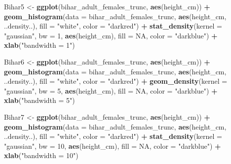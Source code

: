 \documentclass[]{book}
\newenvironment{Shaded}{\begin{snugshade}}{\end{snugshade}}
\newcommand{\KeywordTok}[1]{\textcolor[rgb]{0.13,0.29,0.53}{\textbf{#1}}}
\newcommand{\DataTypeTok}[1]{\textcolor[rgb]{0.13,0.29,0.53}{#1}}
\newcommand{\DecValTok}[1]{\textcolor[rgb]{0.00,0.00,0.81}{#1}}
\newcommand{\StringTok}[1]{\textcolor[rgb]{0.31,0.60,0.02}{#1}}
\newcommand{\OtherTok}[1]{\textcolor[rgb]{0.56,0.35,0.01}{#1}}
\newcommand{\OperatorTok}[1]{\textcolor[rgb]{0.81,0.36,0.00}{\textbf{#1}}}
\newcommand{\NormalTok}[1]{#1}
\theoremstyle{definition}
\theoremstyle{definition}
\theoremstyle{definition}
\theoremstyle{remark}
\begin{document}
\begin{Shaded}
\begin{Highlighting}[]
\NormalTok{Bihar5 <-}\StringTok{ }\KeywordTok{ggplot}\NormalTok{(bihar_adult_females_trunc, }\KeywordTok{aes}\NormalTok{(height_cm)) }\OperatorTok{+}\StringTok{ }
\StringTok{  }\KeywordTok{geom_histogram}\NormalTok{(}\DataTypeTok{data =}\NormalTok{ bihar_adult_females_trunc, }\KeywordTok{aes}\NormalTok{(height_cm, ..density..), }\DataTypeTok{fill =} \StringTok{"white"}\NormalTok{, }\DataTypeTok{color =} \StringTok{"darkred"}\NormalTok{) }\OperatorTok{+}
\StringTok{  }\KeywordTok{stat_density}\NormalTok{(}\DataTypeTok{kernel =} \StringTok{"gaussian"}\NormalTok{, }\DataTypeTok{bw =} \DecValTok{1}\NormalTok{, }\KeywordTok{aes}\NormalTok{(height_cm), }\DataTypeTok{fill =} \OtherTok{NA}\NormalTok{, }\DataTypeTok{color =} \StringTok{"darkblue"}\NormalTok{) }\OperatorTok{+}
\StringTok{  }\KeywordTok{xlab}\NormalTok{(}\StringTok{"bandwidth = 1"}\NormalTok{)}

\NormalTok{Bihar6 <-}\StringTok{ }\KeywordTok{ggplot}\NormalTok{(bihar_adult_females_trunc, }\KeywordTok{aes}\NormalTok{(height_cm)) }\OperatorTok{+}\StringTok{ }
\StringTok{  }\KeywordTok{geom_histogram}\NormalTok{(}\DataTypeTok{data =}\NormalTok{ bihar_adult_females_trunc, }\KeywordTok{aes}\NormalTok{(height_cm, ..density..), }\DataTypeTok{fill =} \StringTok{"white"}\NormalTok{, }\DataTypeTok{color =} \StringTok{"darkred"}\NormalTok{) }\OperatorTok{+}
\StringTok{  }\KeywordTok{geom_density}\NormalTok{(}\DataTypeTok{kernel =} \StringTok{"gaussian"}\NormalTok{, }\DataTypeTok{bw =} \DecValTok{5}\NormalTok{, }\KeywordTok{aes}\NormalTok{(height_cm), }\DataTypeTok{fill =} \OtherTok{NA}\NormalTok{, }\DataTypeTok{color =} \StringTok{"darkblue"}\NormalTok{) }\OperatorTok{+}
\StringTok{  }\KeywordTok{xlab}\NormalTok{(}\StringTok{"bandwidth = 5"}\NormalTok{)}

\NormalTok{Bihar7 <-}\StringTok{ }\KeywordTok{ggplot}\NormalTok{(bihar_adult_females_trunc, }\KeywordTok{aes}\NormalTok{(height_cm)) }\OperatorTok{+}\StringTok{ }
\StringTok{  }\KeywordTok{geom_histogram}\NormalTok{(}\DataTypeTok{data =}\NormalTok{ bihar_adult_females_trunc, }\KeywordTok{aes}\NormalTok{(height_cm, ..density..), }\DataTypeTok{fill =} \StringTok{"white"}\NormalTok{, }\DataTypeTok{color =} \StringTok{"darkred"}\NormalTok{) }\OperatorTok{+}
\StringTok{  }\KeywordTok{stat_density}\NormalTok{(}\DataTypeTok{kernel =} \StringTok{"gaussian"}\NormalTok{, }\DataTypeTok{bw =} \DecValTok{10}\NormalTok{, }\KeywordTok{aes}\NormalTok{(height_cm), }\DataTypeTok{fill =} \OtherTok{NA}\NormalTok{, }\DataTypeTok{color =} \StringTok{"darkblue"}\NormalTok{) }\OperatorTok{+}
\StringTok{  }\KeywordTok{xlab}\NormalTok{(}\StringTok{"bandwidth = 10"}\NormalTok{)}


\end{Highlighting}
\end{Shaded}
\end{document}
